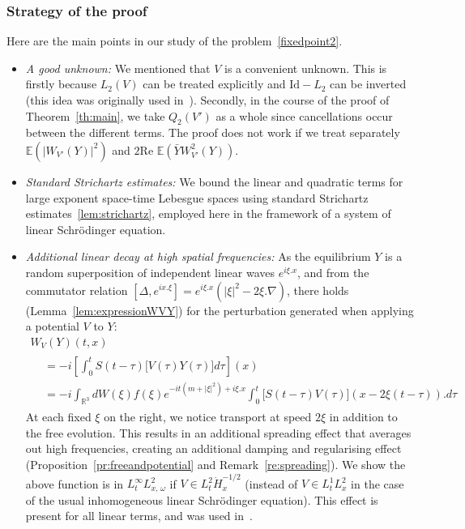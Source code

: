 \documentclass[10pt]{amsart}
\theoremstyle{definition}\newtheorem{defi}[theo]{Definition}\newtheorem{rema}[theo]{Remark}\newtheorem{exam}[theo]{Example}\newtheorem{exem}[theo]{Example}\newtheorem{nota}[theo]{Notation}
\newcommand{\R}{\mathbb{R}}
\newcommand{\E}{\mathbb{E}}
\newcommand{\Id}{\mathrm{Id}}
\begin{document}
\subsubsection{Strategy of the proof}
Here are the main points in our study of the problem~\eqref{fixedpoint2}.
\begin{itemize}
\item \emph{A good unknown:} We mentioned that $V$ is a convenient unknown. This is firstly because $L_2(V)$ can be treated explicitly and $\Id-L_2$ can be inverted (this idea was originally used in~\cite{hainzl2005existence,lewsab2}). Secondly, in the course of the proof of Theorem~\ref{th:main}, we take $Q_2(V')$ as a whole since cancellations occur between the different terms. The proof does not work if we treat separately $\E (|W_{V'}(Y)|^2)$ and $2 \textrm{Re } \E(\bar Y W_{V'}^2 (Y))$.

\item \emph{Standard Strichartz estimates:} We bound the linear and quadratic terms for large exponent space-time Lebesgue spaces using standard Strichartz estimates~\eqref{lem:strichartz}, employed here in the framework of a system of linear Schr\"odinger equation.

\item \emph{Additional linear decay at high spatial frequencies:} As the equilibrium $Y$ is a random superposition of independent linear waves $e^{i\xi.x}$, and from the commutator relation $[\Delta,e^{ix.\xi}]=e^{i\xi.x}(|\xi|^2-2\xi.\nabla)$, there holds (Lemma~\ref{lem:expressionWVY}) for the perturbation generated when applying a potential $V$ to $Y$:
\begin{multline*}
W_V(Y)(t,x)\\
\begin{aligned}
&=-i\left[\int_0^t S(t-\tau) \big[V(\tau) Y(\tau)\big] d\tau\right](x) \\
&=-i \int_{\R^3} dW(\xi) f(\xi) e^{-it\left(m+ |\xi|^2\right)+i\xi.x} \int_{0}^t \big[S (t-\tau) V(\tau)\big](x-2\xi (t-\tau)).d\tau
\end{aligned}
\end{multline*}
At each fixed $\xi$ on the right, we notice transport at speed $2\xi$ in addition to the free evolution. This results in an additional spreading effect that averages out high frequencies, creating an additional damping and regularising effect (Proposition~\ref{pr:freeandpotential} and Remark~\ref{re:spreading}). We show the above function is in $L^{\infty}_tL^2_{x,\,\omega}$ if $V\in L^{2}_t\dot H^{-1/2}_x$ (instead of $V\in L^1_tL^2_x$ in the case of the usual inhomogeneous linear Schr\"odinger equation). This effect is present for all linear terms, and was used in~\cite{CodS}.


\end{itemize}
\end{document}
